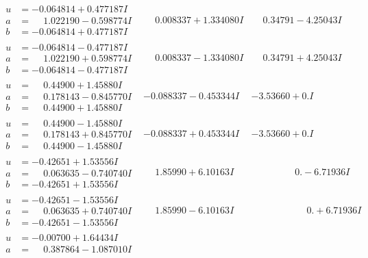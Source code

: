 \documentclass[1p]{elsarticle_modified}
\theoremstyle{definition}
\begin{document}
$$\begin{array}{c|c|c}
\begin{aligned}
u &= -0.064814 + 0.477187 I \\
a &= \phantom{-}1.022190 - 0.598774 I \\
b &= -0.064814 + 0.477187 I\end{aligned}
 & \phantom{-}0.008337 + 1.334080 I & \phantom{-}0.34791 - 4.25043 I \\ \hline\begin{aligned}
u &= -0.064814 - 0.477187 I \\
a &= \phantom{-}1.022190 + 0.598774 I \\
b &= -0.064814 - 0.477187 I\end{aligned}
 & \phantom{-}0.008337 - 1.334080 I & \phantom{-}0.34791 + 4.25043 I \\ \hline\begin{aligned}
u &= \phantom{-}0.44900 + 1.45880 I \\
a &= \phantom{-}0.178143 - 0.845770 I \\
b &= \phantom{-}0.44900 + 1.45880 I\end{aligned}
 & -0.088337 - 0.453344 I & -3.53660 + 0. I\phantom{ +0.000000I} \\ \hline\begin{aligned}
u &= \phantom{-}0.44900 - 1.45880 I \\
a &= \phantom{-}0.178143 + 0.845770 I \\
b &= \phantom{-}0.44900 - 1.45880 I\end{aligned}
 & -0.088337 + 0.453344 I & -3.53660 + 0. I\phantom{ +0.000000I} \\ \hline\begin{aligned}
u &= -0.42651 + 1.53556 I \\
a &= \phantom{-}0.063635 - 0.740740 I \\
b &= -0.42651 + 1.53556 I\end{aligned}
 & \phantom{-}1.85990 + 6.10163 I & \phantom{-0.000000 } 0. - 6.71936 I \\ \hline\begin{aligned}
u &= -0.42651 - 1.53556 I \\
a &= \phantom{-}0.063635 + 0.740740 I \\
b &= -0.42651 - 1.53556 I\end{aligned}
 & \phantom{-}1.85990 - 6.10163 I & \phantom{-0.000000 -}0. + 6.71936 I \\ \hline\begin{aligned}
u &= -0.00700 + 1.64434 I \\
a &= \phantom{-}0.387864 - 1.087010 I \\

\end{aligned}
\end{array}$$
\end{document}
